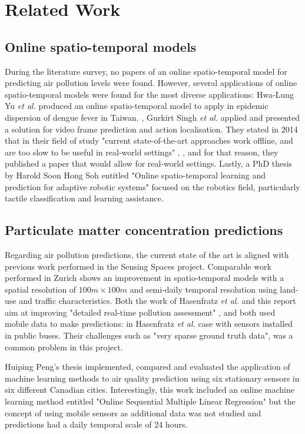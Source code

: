 \section{Related Work}

\subsection{Online spatio-temporal models}

During the literature survey, no papers of an online spatio-temporal model for predicting air pollution levels were found. However, several applications of online spatio-temporal models were found for the most diverse applications: Hwa-Lung Yu \textit{et al.} produced an online spatio-temporal model to apply in epidemic dispersion of dengue fever in Taiwan. \cite{epidemic}, Gurkirt Singh \textit{et al.} applied and presented a solution for video frame prediction and action localisation. They stated in 2014 that in their field of study "current state-of-the-art approaches work offline, and are too slow to be useful in real-world settings" \cite{frame_pred}, , and for that reason, they published a paper that would allow for real-world settings. Lastly, a PhD thesis by Harold Soon Hong Soh entitled "Online spatio-temporal learning and prediction for adaptive robotic systems" \cite{robotics} focused on the robotics field, particularly tactile classification and learning assistance.

\subsection{Particulate matter concentration predictions}

Regarding air pollution predictions, the current state of the art is aligned with previous work performed in the Sensing Spaces project. Comparable work performed in Zurich \cite{zurich} shows an improvement in spatio-temporal models with a spatial resolution of $100 m \times 100 m$ and semi-daily temporal resolution using land-use and traffic characteristics. Both the work of Hasenfratz \textit{et al.} and this report aim at improving "detailed real-time pollution assessment" \cite{zurich}, and both used mobile data to make predictions: in Hasenfratz \textit{et al.} case with sensors installed in public buses. Their challenges such as "very sparse ground truth data", was a common problem in this project.

Huiping Peng's thesis \cite{peng} implemented, compared and evaluated the application of machine learning methods to air quality prediction using six stationary sensors in six different Canadian cities. Interestingly, this work included an online machine learning method entitled "Online Sequential Multiple Linear Regression" but the concept of using mobile sensors as additional data was not studied and predictions had a daily temporal scale of 24 hours.

